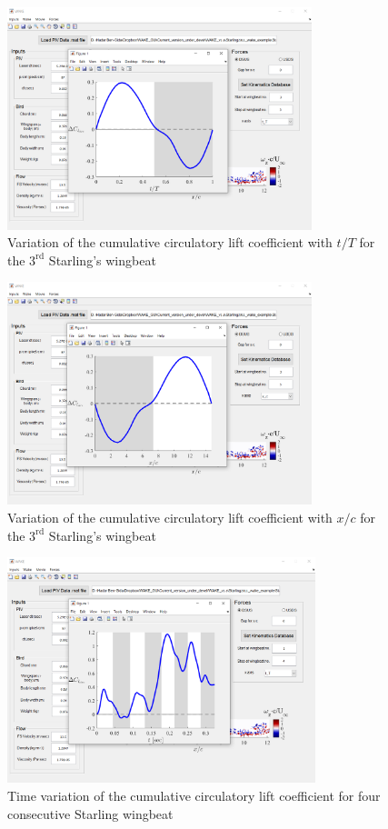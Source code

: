 \documentclass[12pt,a4paper]{article}
\begin{document}
\begin{figure}[ht!]
	\centering
	\includegraphics[width=0.79\textwidth]{dCl-plot}
	\caption{Variation of the cumulative circulatory lift coefficient with $t/T$ for the $3^\mathrm{rd}$ Starling's wingbeat}
	\label{fig:GUI-dCl-plot}
\end{figure}

\begin{figure}[ht!]
	\centering
	\includegraphics[width=0.79\textwidth]{dCl-plot-vs-x_c}
	\caption{Variation of the cumulative circulatory lift coefficient with $x/c$ for the $3^\mathrm{rd}$ Starling's wingbeat}
	\label{fig:GUI-dCl-plot-vs-x_c}
\end{figure}

\newpage
\begin{figure}[ht!]
	\centering
	\includegraphics[width=0.8\textwidth]{dCl-plot-vs-time-4-wingbeats}
	\caption{Time variation of the cumulative circulatory lift coefficient for four consecutive Starling wingbeat}
	\label{fig:GUI-dCl-plot-vs-time-4-wingbeats}
\end{figure}
\end{document}
